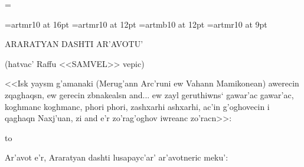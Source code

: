 
\magnification=



\font\artmLARGE=artmr10 at 16pt
\font\artmlarge=artmr10 at 12pt
\font\artmbflarge=artmb10 at 12pt
\font\artmsmall=artmr10 at 9pt
\hyphenchar{}
\artm

\parskip=5pt

\vglue 20pt

\centerline{\artmLARGE ARARATYAN DASHTI AR'AVOTU'}

\smallskip

\centerline{\artmlarge (hatvac' {\artmbflarge Raffu} <<SAMVEL>> vepic)}

\vskip 60pt

{\leftskip=150pt\artmsmall
%
<<Isk yaysm g'amanaki (Merug'ann Arc'runi ew Vahann Mamikonean) awerecin
zqaghaqsn, ew gerecin zbnakealsn and... ew zayl geruthiwns` gawar'ac gawar'ac,
koghmanc kogh\-manc, phori phori, zashxarhi ashxarhi, ac'in g'oghovecin i
qaghaqn Naxj'uan, zi and e'r zo'rag'oghov iwreanc zo'racn>>:
%
\par}

\bigskip

\hbox to 

\vskip 40pt

Ar'avot e'r, Araratyan dashti lusapayc'ar' ar'avotneric meku':


